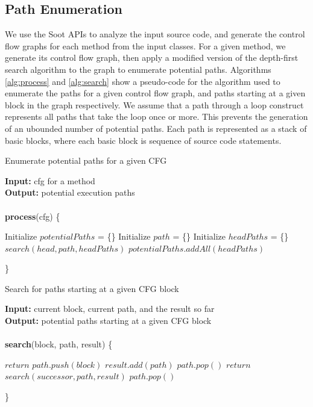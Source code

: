 \documentclass[10pt,twocolumn,letterpaper]{article}
\begin{document}
\subsection{Path Enumeration}
We use the Soot \cite{vallee1999soot} APIs to analyze the input source code, and generate the control flow graphs for each method from the input classes. For a
given method, we generate its control flow graph, then apply a modified version of the depth-first search algorithm to the graph to enumerate potential paths.
Algorithms \ref{alg:process} and \ref{alg:search} show a pseudo-code for the algorithm used to enumerate the paths for a given control flow graph, and paths
starting at a given block in the graph respectively. We assume that a path through a loop construct represents all paths that take the loop once or more. This
prevents the generation of an ubounded number of potential paths. Each path is represented as a stack of basic blocks, where each basic block is sequence of
source code statements.

\begin{algorithm}[h!]
\caption{Enumerate potential paths for a given CFG}
\label{alg:process}
\textbf{Input:} {cfg for a method} \\
\textbf{Output:} {potential execution paths} \\ \\
\textbf{process}(cfg) \{
\begin{algorithmic}
\STATE Initialize $potentialPaths$ = \{\}
     \STATE Initialize $path$ = \{\}
     \STATE Initialize $headPaths$ = \{\}
     \STATE $search(head, path, headPaths)$
     \STATE $potentialPaths.addAll(headPaths)$
    \ENDFOR
\end{algorithmic}
\}
\end{algorithm}

\begin{algorithm}[h!]
\caption{Search for paths starting at a given CFG block}
\label{alg:search}
\textbf{Input:} {current block, current path, and the result so far} \\
\textbf{Output:} {potential paths starting at a given CFG block} \\ \\
\textbf{search}(block, path, result) \{
\begin{algorithmic}
    \STATE $return$
   \ENDIF
   \STATE $path.push(block)$ 
    \STATE $result.add(path)$
    \STATE $path.pop()$ 
    \STATE $return$
   \ENDIF
    \STATE $search(successor, path, result)$
   \ENDFOR
   \STATE $path.pop()$ 
\end{algorithmic}
\}
\end{algorithm}
\end{document}
